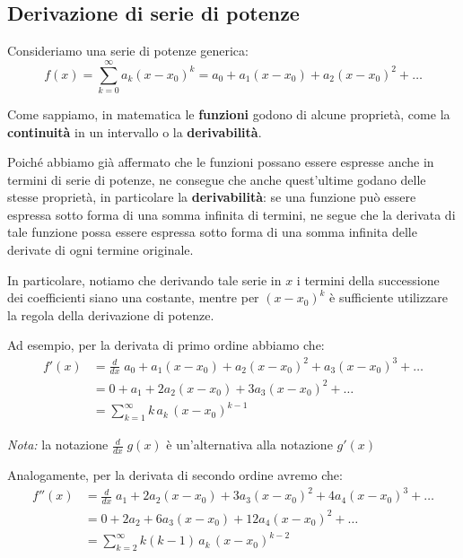 \documentclass[a4paper, 12pt]{report}
\begin{document}
    \quad

    \subsection{Derivazione di serie di potenze}

    Consideriamo una serie di potenze generica:
    \[ f(x) = \sum_{k=0}^{\infty} a_k (x-x_0)^k = a_0 + a_1 (x-x_0) + a_2 (x-x_0)^2 + \ldots\]
    
    Come sappiamo, in matematica le \textbf{funzioni} godono di alcune proprietà, come la \textbf{continuità} in un intervallo o la \textbf{derivabilità}.
    
    Poiché abbiamo già affermato che le funzioni possano essere espresse anche in termini di serie di potenze, ne consegue che anche quest'ultime godano delle stesse proprietà, in particolare la \textbf{derivabilità}: se una funzione può essere espressa sotto forma di una somma infinita di termini, ne segue che la derivata di tale funzione possa essere espressa sotto forma di una somma infinita delle derivate di ogni termine originale.

    In particolare, notiamo che derivando tale serie in $x$ i termini della successione dei coefficienti siano una costante, mentre per $(x-x_0)^k$ è sufficiente utilizzare la regola della derivazione di potenze. 

    Ad esempio, per la derivata di primo ordine abbiamo che:
    \[ \begin{split}
        f'(x) &= \frac{d}{d x} \; a_0 + a_1 (x-x_0) + a_2 (x-x_0)^2 + a_3 (x-x_0)^3 + \ldots\\
        &= 0 + a_1 + 2 a_2 (x-x_0) + 3 a_3 (x-x_0)^2 + \ldots \\
        &= \sum_{k=1}^{\infty} k \, a_k \, (x-x_0)^{k-1}
    \end{split}\]

    \textit{Nota:} la notazione $\frac{d}{dx} \; g(x)$ è un'alternativa alla notazione $g'(x)$

    Analogamente, per la derivata di secondo ordine avremo che:
    \[ \begin{split}
        f''(x) &= \frac{d}{d x} \; a_1 + 2 a_2 (x-x_0) + 3 a_3 (x-x_0)^2 + 4 a_4 (x-x_0)^3 + \ldots\\
        &= 0 + 2a_2 + 6 a_3 (x-x_0) + 12 a_4 (x-x_0)^2 + \ldots \\
        &= \sum_{k=2}^{\infty} k (k-1) \, a_k \, (x-x_0)^{k-2}
    \end{split}\]
\end{document}
